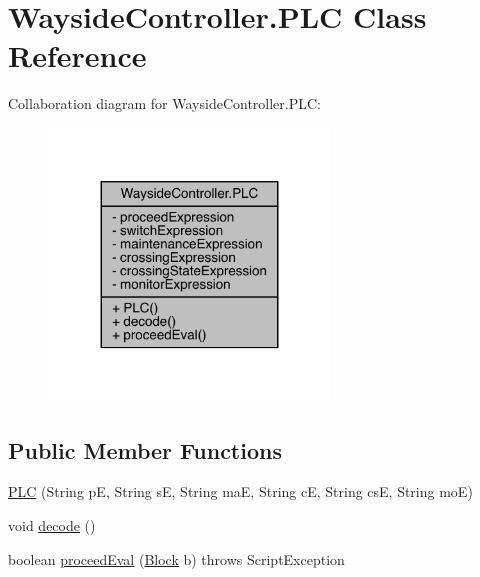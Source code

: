 \hypertarget{classWaysideController_1_1PLC}{}\section{Wayside\+Controller.\+P\+LC Class Reference}
\label{classWaysideController_1_1PLC}


Collaboration diagram for Wayside\+Controller.\+P\+LC\+:
\nopagebreak
\begin{figure}[H]
\begin{center}
\leavevmode
\includegraphics[width=212pt]{classWaysideController_1_1PLC__coll__graph}
\end{center}
\end{figure}
\subsection*{Public Member Functions}
\begin{DoxyCompactItemize}
\item 
\hyperlink{classWaysideController_1_1PLC_af4c4636b44883be330c95dadb07ce0b9}{P\+LC} (String pE, String sE, String maE, String cE, String csE, String moE)
\item 
void \hyperlink{classWaysideController_1_1PLC_a22c9f62b45d4af0d977188967cb40134}{decode} ()
\item 
boolean \hyperlink{classWaysideController_1_1PLC_aa744955096a2d7156c6ad8a798c6db08}{proceed\+Eval} (\hyperlink{classTrackModel_1_1Block}{Block} b)  throws Script\+Exception
\end{DoxyCompactItemize}
